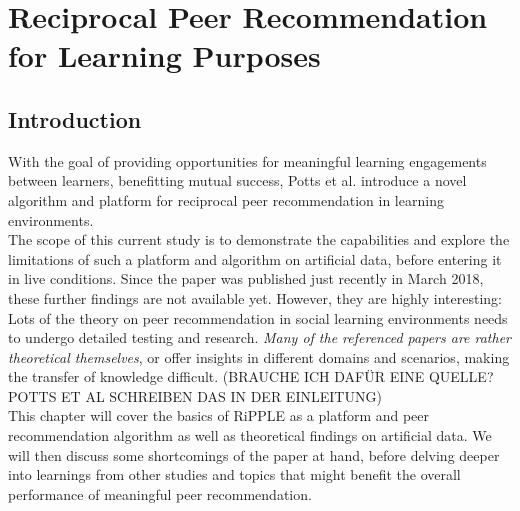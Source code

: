 \documentclass[nochapterpage,bigchapter,linedtoc,longdoc,colorback,accentcolor=tud3b,oneside]{tudreport}
\begin{document}
\chapter{Reciprocal Peer Recommendation for Learning Purposes}
\section{Introduction}
With the goal of providing opportunities for meaningful learning engagements between learners, benefitting mutual success, Potts et al. introduce a novel algorithm and platform for reciprocal peer recommendation in learning environments.\\
The scope of this current study is to demonstrate the capabilities and explore the limitations of such a platform and algorithm on artificial data, before entering it in live conditions. Since the paper was published just recently in March 2018, these further findings are not available yet. However, they are highly interesting: Lots of the theory on peer recommendation in social learning environments needs to undergo detailed testing and research. \textit{Many of the referenced papers are rather theoretical themselves}, or offer insights in different domains and scenarios, making the transfer of knowledge difficult. (BRAUCHE ICH DAFÜR EINE QUELLE? POTTS ET AL SCHREIBEN DAS IN DER EINLEITUNG)\\
This chapter will cover the basics of RiPPLE as a platform and peer recommendation algorithm as well as theoretical findings on artificial data. We will then discuss some shortcomings of the paper at hand, before delving deeper into learnings from other studies and topics that might benefit the overall performance of meaningful peer recommendation.\\
\end{document}
